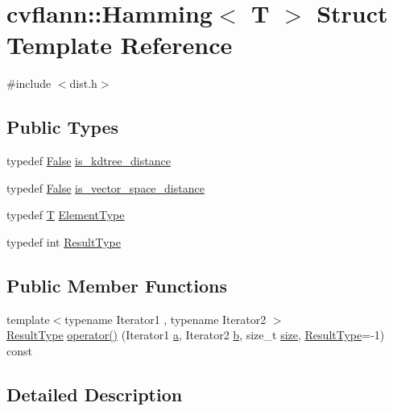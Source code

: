 \hypertarget{structcvflann_1_1Hamming}{\section{cvflann\-:\-:Hamming$<$ T $>$ Struct Template Reference}
\label{structcvflann_1_1Hamming}
}


{\ttfamily \#include $<$dist.\-h$>$}

\subsection*{Public Types}
\begin{DoxyCompactItemize}
\item 
typedef \hyperlink{classcvflann_1_1False}{False} \hyperlink{structcvflann_1_1Hamming_a3b2a3e130d86c02b8cac98ae58645bad}{is\-\_\-kdtree\-\_\-distance}
\item 
typedef \hyperlink{classcvflann_1_1False}{False} \hyperlink{structcvflann_1_1Hamming_ac59dee15cce5d7a01bf8dc54ef30a305}{is\-\_\-vector\-\_\-space\-\_\-distance}
\item 
typedef \hyperlink{calib3d_8hpp_a3efb9551a871ddd0463079a808916717}{T} \hyperlink{structcvflann_1_1Hamming_a2be434e23cf78b659dc72d6a0d5fa41e}{Element\-Type}
\item 
typedef int \hyperlink{structcvflann_1_1Hamming_a08d0b008dcd6bce54b0f305176478d29}{Result\-Type}
\end{DoxyCompactItemize}
\subsection*{Public Member Functions}
\begin{DoxyCompactItemize}
\item 
{\footnotesize template$<$typename Iterator1 , typename Iterator2 $>$ }\\\hyperlink{structcvflann_1_1Hamming_a08d0b008dcd6bce54b0f305176478d29}{Result\-Type} \hyperlink{structcvflann_1_1Hamming_a70f6160b6889e7e6546602b54b4408fe}{operator()} (Iterator1 \hyperlink{legacy_8hpp_a1031d0e0a97a340abfe0a6ab9e831045}{a}, Iterator2 \hyperlink{legacy_8hpp_ac04272e8ca865b8fba18d36edae9fd2a}{b}, size\-\_\-t \hyperlink{legacy_8hpp_ae97003f8d5c64cdfb99f6f2606d121b6}{size}, \hyperlink{structcvflann_1_1Hamming_a08d0b008dcd6bce54b0f305176478d29}{Result\-Type}=-\/1) const 
\end{DoxyCompactItemize}


\subsection{Detailed Description}
